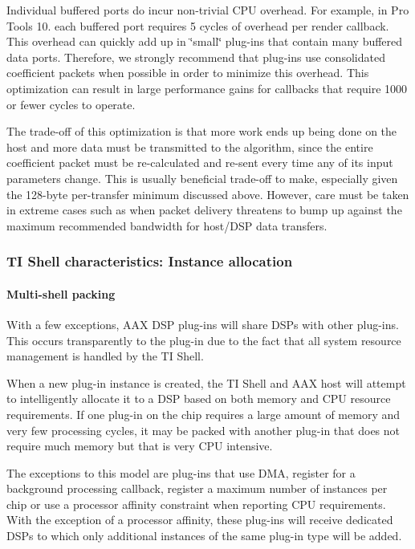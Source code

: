 Individual buffered ports do incur non-\/trivial C\+P\+U overhead. For example, in Pro Tools 10. each buffered port requires 5 cycles of overhead per render callback. This overhead can quickly add up in \char`\"{}small\char`\"{} plug-\/ins that contain many buffered data ports. Therefore, we strongly recommend that plug-\/ins use consolidated coefficient packets when possible in order to minimize this overhead. This optimization can result in large performance gains for callbacks that require 1000 or fewer cycles to operate.

The trade-\/off of this optimization is that more work ends up being done on the host and more data must be transmitted to the algorithm, since the entire coefficient packet must be re-\/calculated and re-\/sent every time any of its input parameters change. This is usually beneficial trade-\/off to make, especially given the 128-\/byte per-\/transfer minimum discussed above. However, care must be taken in extreme cases such as when packet delivery threatens to bump up against the maximum recommended bandwidth for host/\+D\+S\+P data transfers.

\hypertarget{a00362_subsection__ti_shell_characteristics_instance_allocation}{}\subsubsection{T\+I Shell characteristics\+: Instance allocation}\label{a00362_subsection__ti_shell_characteristics_instance_allocation}
 \hypertarget{a00362_subsubsection__multishell_packing_}{}\paragraph{Multi-\/shell packing}\label{a00362_subsubsection__multishell_packing_}
 With a few exceptions, A\+A\+X D\+S\+P plug-\/ins will share D\+S\+Ps with other plug-\/ins. This occurs transparently to the plug-\/in due to the fact that all system resource management is handled by the T\+I Shell.

When a new plug-\/in instance is created, the T\+I Shell and A\+A\+X host will attempt to intelligently allocate it to a D\+S\+P based on both memory and C\+P\+U resource requirements. If one plug-\/in on the chip requires a large amount of memory and very few processing cycles, it may be packed with another plug-\/in that does not require much memory but that is very C\+P\+U intensive.

The exceptions to this model are plug-\/ins that use D\+M\+A, register for a background processing callback, register a maximum number of instances per chip or use a processor affinity constraint when reporting C\+P\+U requirements. With the exception of a processor affinity, these plug-\/ins will receive dedicated D\+S\+Ps to which only additional instances of the same plug-\/in type will be added.

